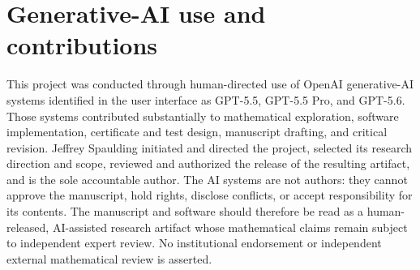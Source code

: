 \documentclass[11pt]{article}
\begin{document}
\section*{Generative-AI use and contributions}

This project was conducted through human-directed use of OpenAI generative-AI
systems identified in the user interface as GPT-5.5, GPT-5.5 Pro, and GPT-5.6.
Those systems contributed substantially to mathematical exploration, software
implementation, certificate and test design, manuscript drafting, and critical
revision.  Jeffrey Spaulding initiated and directed the project, selected its
research direction and scope, reviewed and authorized the release of the
resulting artifact, and is the sole accountable author.  The AI systems are
not authors: they cannot approve the manuscript, hold rights, disclose
conflicts, or accept responsibility for its contents.  The manuscript and
software should therefore be read as a human-released, AI-assisted research
artifact whose mathematical claims remain subject to independent expert
review.  No institutional endorsement or independent external mathematical
review is asserted.
\end{document}
